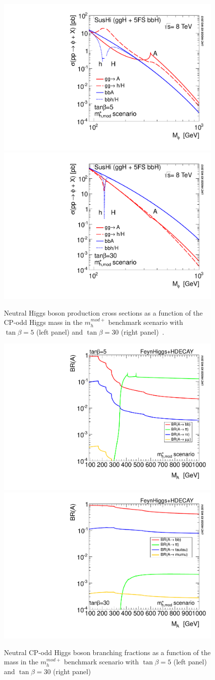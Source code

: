 \begin{figure}[h]
\centering
\includegraphics[width=0.49\columnwidth]{figures_chapter2/YR3HXS_XSectSummary_mhmodp_tanbeta5_SusHi}
\includegraphics[width=0.49\columnwidth]{figures_chapter2/YR3HXS_XSectSummary_mhmodp_tanbeta30_SusHi}
\caption{Neutral Higgs boson production cross sections as a function of the CP-odd Higgs mass in the $m_{h}^{mod+}$ benchmark scenario with $\tan \beta = 5$ (left panel) and $\tan \beta = 30$ (right panel)~\cite{Dittmaier:2011ti,Dittmaier:2012vm,Heinemeyer:2013tqa}.} 
\label{fig:mssm_cross}
\end{figure} 

\begin{figure}[h]
\centering
\includegraphics[width=0.49\columnwidth]{figures_chapter2/YR4HXS_BRSummary_A_mhmodp_tanbeta5_FeynHiggs_HDecay}
\includegraphics[width=0.49\columnwidth]{figures_chapter2/YR4HXS_BRSummary_A_mhmodp_tanbeta30_FeynHiggs_HDecay}
\caption{Neutral CP-odd Higgs boson branching fractions as a function of the mass in the $m_{h}^{mod+}$ benchmark scenario with $\tan \beta = 5$ (left panel) and $\tan \beta = 30$ (right panel)~\cite{Dittmaier:2011ti,Dittmaier:2012vm,Heinemeyer:2013tqa}} 
\label{fig:mssm_decay}
\end{figure} 

